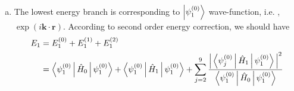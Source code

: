 \documentclass[12pt]{article}
\begin{document}
\begin{enumerate}[(a)]
	      \begin{equation}
	      	\begin{split}
	      		H_1 = \frac{\hbar^2}{2m}\frac{4\pi^2}{a^2}
	      		\begin{pmatrix}
	      			0     & -0.04 & -0.04 & -0.04 & -0.04 & -0.02 & -0.02 & -0.02 & -0.02 \\
	      			-0.04 & 0     & 0     & -0.02 & -0.02 & -0.04 & 0     & -0.04 & 0     \\
	      			-0.04 & 0     & 0     & -0.02 & -0.02 & 0.    & -0.04 & 0     & -0.04 \\
	      			-0.04 & -0.02 & -0.02 & 0     & 0     & -0.04 & 0     & 0     & -0.04 \\
	      			-0.04 & -0.02 & -0.02 & 0     & 0     & 0     & -0.04 & -0.04 & 0     \\
	      			-0.02 & -0.04 & 0     & -0.04 & 0     & 0     & 0     & 0     & 0     \\
	      			-0.02 & 0     & -0.04 & 0     & -0.04 & 0     & 0     & 0     & 0     \\
	      			-0.02 & -0.04 & 0     & 0     & -0.04 & 0     & 0     & 0     & 0     \\
	      			-0.02 & 0     & -0.04 & -0.04 & 0     & 0     & 0     & 0     & 0     \\
	      		\end{pmatrix}.
	      	\end{split}
	      \end{equation}
	      According to the perturbation theory, the first order of energy corrections should be
	      \begin{equation}
	      	E_n^{(1)} = \Braket{\psi_n^{(0)} | H_1 | \psi_n^{(0)}}, \quad n = 1, \ldots, 9,
	      \end{equation}
	      which are the diagonal values of $H_1$. However, clearly we can see, these values are all $0$. So this potential does not
	      give a non-zero first order correction.
	\item The lowest energy branch is corresponding to $\Ket{\psi_1^{(0)}}$ wave-function, i.e. , $\exp(i \bm{k} \cdot \bm{r})$.
	      According to second order energy correction, we should have
	      \begin{equation}
	      	\begin{split}
	      		E_1 &= E_1^{(0)} + E_1^{(1)} + E_1^{(2)}\\
	      		&= \Braket{\psi_1^{(0)} | \hat{H}_0 | \psi_1^{(0)}} + \Braket{\psi_1^{(0)} | \hat{H}_1 | \psi_1^{(0)}} +
	      		\sum_{j=2}^{9} \frac{\Big\lvert \Braket{\psi_j^{(0)} | \hat{H}_1 | \psi_1^{(0)}} \Big\rvert^2}{ \Braket{\psi_1^{(0)} | \hat{H}_0 | \psi_1^{(0)}}
}
\end{split}
\end{equation}
\end{enumerate}
\end{document}
